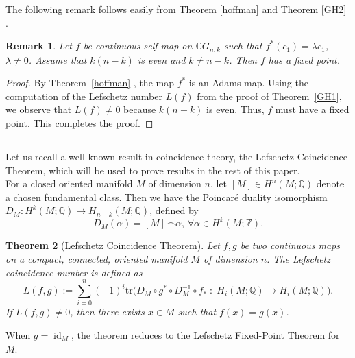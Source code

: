 \documentclass{amsart}
\newtheorem{theorem}{Theorem}[section]
\newtheorem{remark}[theorem]{Remark}
\begin{document}
	The following remark follows easily from Theorem \ref{hoffman} \cite{hoffman} and Theorem \ref{GH2} \cite{glover-homer}.
	\begin{remark}Let $f$ be continuous self-map on $\mathbb CG_{n,k}$ such that
		$ f^*(c_1) = \lambda c_1 $, $ \lambda\neq 0 $. Assume that $k(n-k)$ is even and $k\neq n-k$. Then $f$ has a fixed point. 
	\end{remark}
	\begin{proof}
		By Theorem~\ref{hoffman} \cite{hoffman}, the map $f^*$ is an Adams map. Using the computation of the Lefschetz number $L(f)$ from the proof of Theorem~\ref{GH1}, we observe that $L(f) \ne 0$ because $k(n-k)$ is even. Thus, $f$ must have a fixed point. This completes the proof.
	\end{proof}
	\fi
	
	\subsection{} Let us recall a well known result in coincidence theory, the Lefschetz Coincidence Theorem, which will be used to prove results in the rest of this paper.\\
	
	For a closed oriented manifold $M$ of dimension $n$, let $[M]\in H^n(M;\mathbb Q)$ denote a chosen fundamental class. Then we have the Poincar\'e  duality isomorphism $D_M:H^k(M;\mathbb Q)\to H_{n-k}(M;\mathbb Q)$, defined by 
	\begin{equation}\label{poinc dua}
		D_M(\alpha)=[M]\frown \alpha, \, \forall \alpha\in H^k(M;\mathbb Z).
	\end{equation}

	
	\begin{theorem}[Lefschetz Coincidence Theorem]\label{LCT}
		Let $f,g$ be two continuous maps on a compact, connected, oriented manifold $M$ of  dimension $n$. The Lefschetz coincidence number is defined as 
		$$L(f,g):= \sum_{i=0}^{n} (-1)^i \mathrm{tr}\big(D_M \circ g^* \circ D_M^{-1} \circ f_* \; : \; H_i(M;\mathbb{Q}) \longrightarrow H_i(M;\mathbb{Q})\big).
		$$ If $L(f,g) \neq 0$, then there exists $x \in M$ such that $f(x) = g(x)$.
	\end{theorem}
	When  $g=\operatorname{id}_M$, the theorem reduces to the Lefschetz Fixed-Point Theorem for $M$.\\
	
\end{document}
